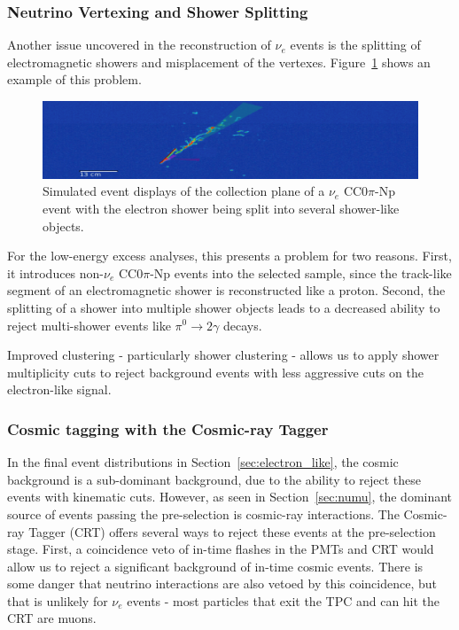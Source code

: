 \subsubsection{Neutrino Vertexing and Shower Splitting}

Another issue uncovered in the reconstruction of $\nu_{e}$ events is the splitting of electromagnetic showers and misplacement of the vertexes. 
Figure~\ref{fig:evd_2showers} shows an example of this problem.  

\begin{figure}[htbp]
\centering
  \includegraphics[width=0.7\linewidth]{figures/splitshower.png}
  \caption{Simulated event displays of the collection plane of a $\nu_{e}$ CC0$\pi$-Np event with the electron shower being split into several shower-like objects.}
  \label{fig:evd_2showers}
\end{figure}

For the low-energy excess analyses, this presents a problem for two reasons.  First, it introduces non-$\nu_{e}$ CC0$\pi$-Np events into the selected sample, since the track-like segment of an electromagnetic shower is reconstructed like a proton. Second, the splitting of a shower into multiple shower objects leads to a decreased ability to reject multi-shower events like $\pi^0\rightarrow2\gamma$ decays.

Improved clustering - particularly shower clustering - allows us to apply shower multiplicity cuts to reject background events with less aggressive cuts on the electron-like signal.

\subsubsection{Cosmic tagging with the Cosmic-ray Tagger}

In the final event distributions in Section~\ref{sec:electron_like}, the cosmic background is a sub-dominant background, due to the ability to reject these events with kinematic cuts.  However, as seen in Section~\ref{sec:numu}, the dominant source of events passing the pre-selection is cosmic-ray interactions.  The Cosmic-ray Tagger (CRT) offers several ways to reject these events at the pre-selection stage.  First, a coincidence veto of in-time flashes in the PMTs and CRT would allow us to reject a significant background of in-time cosmic events.  There is some danger that neutrino interactions are also vetoed by this coincidence, but that is unlikely for $\nu_{e}$ events - most particles that exit the TPC and can hit the CRT are muons.

